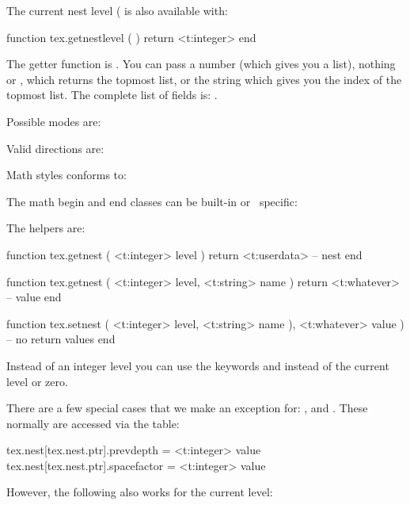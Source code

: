 \typebuffer

\start \forgetall \getbuffer
\startlinecorrection
    \box\scratchbox
\stoplinecorrection
\stop

The current nest level ( is also available with:

\starttyping[option=LUA]
function tex.getnestlevel ( )
    return <t:integer>
end
\stoptyping

The getter function is . You can pass a number (which gives
you a list), nothing or , which returns the topmost list, or the
string  which gives you the index of the topmost list. The complete list
of fields is: .

Possible modes are:

\startcolumns[n=2]
\stopcolumns

Valid directions are:

\startcolumns[n=2]
\stopcolumns

Math styles conforms to:

\startcolumns[n=2]
\stopcolumns

The math begin and end classes can be built-in or \CONTEXT\ specific:

\startcolumns[n=4]
\stopcolumns

The helpers are:

\starttyping[option=LUA]
function tex.getnest ( <t:integer> level )
    return <t:userdata> -- nest
end

function tex.getnest ( <t:integer> level, <t:string> name )
    return <t:whatever> -- value
end

function tex.setnest ( <t:integer> level, <t:string> name ), <t:whatever> value )
    -- no return values
end
\stoptyping

Instead of an integer level you can use the keywords  and 
instead of the current level or zero.

There are a few special cases that we make an exception for: ,
 and . These normally are accessed via the
 table:

\starttyping
tex.nest[tex.nest.ptr].prevdepth   = <t:integer> value
tex.nest[tex.nest.ptr].spacefactor = <t:integer> value
\stoptyping

However, the following also works for the current level:

